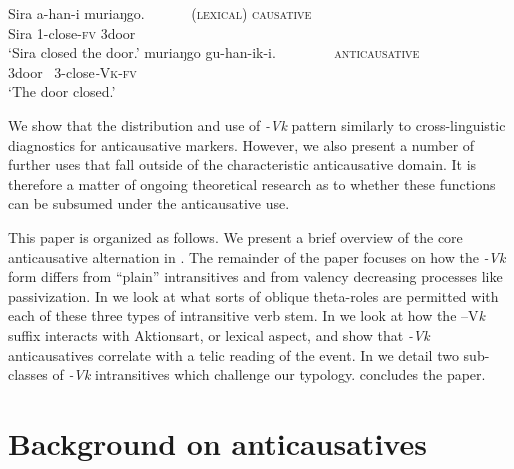 \documentclass[output=paper]{langsci/langscibook}
\begin{document}
\gll  Sira a-han-i       muriaŋgo.~ ~ ~ ~     \textsc{(lexical) causative}\\
       Sira 1-close-\textsc{fv} 3door\\
\glt ‘Sira closed the door.’
\ex\label{ex:gluckman:2b}
\gll  muriaŋgo gu-han-ik-i.~ ~ ~ ~ ~     \textsc{anticausative}\\
       3door ~3-close\textit{-}\textsc{Vk}-\textsc{fv}\\
\glt ‘The door closed.’
\z
\z

We show that the distribution and use of \textit{-Vk} pattern similarly to cross-linguistic diagnostics for anticausative markers. However, we also present a number of further uses that fall outside of the characteristic anticausative domain. It is therefore a matter of ongoing theoretical research as to whether these functions can be subsumed under the anticausative use.
 
This paper is organized as follows. We present a brief overview of the core anticausative alternation in . The remainder of the paper focuses on how the \textit{-Vk} form differs from “plain” intransitives and from valency decreasing processes like passivization. In  we look at what sorts of oblique theta-roles are permitted with each of these three types of intransitive verb stem. In  we look at how the –V\textit{k} suffix interacts with Aktionsart, or lexical aspect, and show that \textit{-Vk} anticausatives correlate with a telic reading of the event. In  we detail two sub-classes of \textit{-Vk} intransitives which challenge our typology.  concludes the paper. 

\section{Background on anticausatives}\label{sec:gluckman:2}
\end{document}
